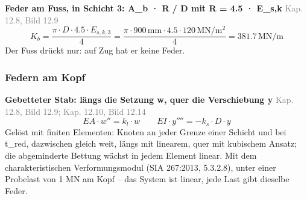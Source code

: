\documentclass[11pt,a4paper]{article}
\newcommand{\normref}[1]{{\small\textcolor{gray}{#1}}}
\begin{document}
\noindent\textbf{Feder am Fuss, in Schicht 3: A\_b · R / D mit R = 4.5 · E\_s,k} \hfill \normref{Kap. 12.8, Bild 12.9}
\begin{equation*}
K_b = \frac{\pi \cdot D \cdot 4.5 \cdot E_{s,k,3}}{4} = \frac{\pi \cdot 900\,\mathrm{mm} \cdot 4.5 \cdot 120\,\mathrm{MN}/\mathrm{m}^{2}}{4} = 381.7\,\mathrm{MN}/\mathrm{m}
\end{equation*}
Der Fuss drückt nur: auf Zug hat er keine Feder.

\subsubsection{Federn am Kopf}
\noindent\textbf{Gebetteter Stab: längs die Setzung w, quer die Verschiebung y} \hfill \normref{Kap. 12.8, Bild 12.9; Kap. 12.10, Bild 12.14}
\begin{equation*}
EA \cdot w'' = k_l \cdot w \qquad EI \cdot y'''' = -k_s \cdot D \cdot y
\end{equation*}
Gelöst mit finiten Elementen: Knoten an jeder Grenze einer Schicht und bei t\_red, dazwischen gleich weit, längs mit linearem, quer mit kubischem Ansatz; die abgeminderte Bettung wächst in jedem Element linear. Mit dem charakteristischen Verformungsmodul (SIA 267:2013, 5.3.2.8), unter einer Probelast von 1 MN am Kopf – das System ist linear, jede Last gibt dieselbe Feder.
\end{document}
